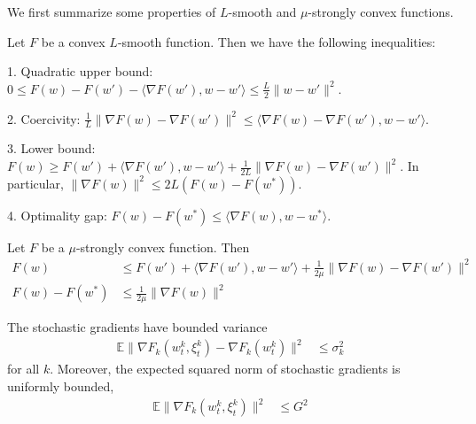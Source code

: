 We first summarize some properties of $L$-smooth and $\mu$-strongly
convex functions. 
\begin{lemma}
	Let $F$ be a convex $L$-smooth function. Then we have the following
	inequalities:
	
	1. Quadratic upper bound: $0\leq F(w)-F(w')-\langle\nabla F(w'),w-w'\rangle\leq\frac{L}{2}\|w-w'\|^{2}$. 
	
	2. Coercivity: $\frac{1}{L}\|\nabla F(w)-\nabla F(w')\|^{2}\leq\langle\nabla F(w)-\nabla F(w'),w-w'\rangle$.
	
	3. Lower bound: $F(w)\geq F(w')+\langle\nabla F(w'),w-w'\rangle+\frac{1}{2L}\|\nabla F(w)-\nabla F(w')\|^{2}$.
	In particular, $\|\nabla F(w)\|^{2}\leq2L(F(w)-F(w^{\ast}))$.
	
	4. Optimality gap: $F(w)-F(w^{\ast})\leq$$\langle\nabla F(w),w-w^{\ast}\rangle$.
\end{lemma}
%
\begin{lemma}
	Let $F$ be a $\mu$-strongly convex function. Then 
	\begin{align*}
	F(w) & \leq F(w')+\langle\nabla F(w'),w-w'\rangle+\frac{1}{2\mu}\|\nabla F(w)-\nabla F(w')\|^{2}\\
	F(w)-F(w^{\ast}) & \leq\frac{1}{2\mu}\|\nabla F(w)\|^{2}
	\end{align*}
\end{lemma}
%
\begin{assumption}
	The stochastic gradients have bounded variance 
	\begin{align*}
	\mathbb{E}\|\nabla F_{k}(w_{t}^{k},\xi_{t}^{k})-\nabla F_{k}(w_{t}^{k})\|^{2} & \leq\sigma_{k}^{2}
	\end{align*}
	for all $k$. Moreover, the expected squared norm of stochastic gradients
	is uniformly bounded, 
	\begin{align*}
	\mathbb{E}\|\nabla F_{k}(w_{t}^{k},\xi_{t}^{k})\|^{2} & \leq G^{2}
	\end{align*}
\end{assumption}
